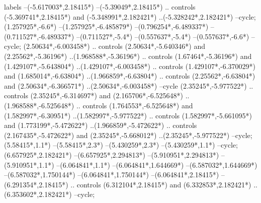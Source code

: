 {\begin{scope}[x=1mm,y=1mm,line width=\SCstroke mm,line cap=round,line join=round]
\begin{SCpart}{labels}
--({-5.617003*\SCF},{2.18415*\SCF})
--({-5.39049*\SCF},{2.18415*\SCF})
.. controls ({-5.369741*\SCF},{2.18415*\SCF}) and ({-5.348991*\SCF},{2.182421*\SCF}) ..({-5.328242*\SCF},{2.182421*\SCF})
--cycle; ({1.257925*\SCF},{-6.6*\SCF})
--({1.257925*\SCF},{-6.485879*\SCF})
--({0.796254*\SCF},{-6.489337*\SCF})
--({0.711527*\SCF},{-6.489337*\SCF})
--({0.711527*\SCF},{-5.4*\SCF})
--({0.557637*\SCF},{-5.4*\SCF})
--({0.557637*\SCF},{-6.6*\SCF})
--cycle;
 ({2.50634*\SCF},{-6.003458*\SCF})
.. controls ({2.50634*\SCF},{-5.640346*\SCF}) and ({2.25562*\SCF},{-5.36196*\SCF}) ..({1.968588*\SCF},{-5.36196*\SCF})
.. controls ({1.67464*\SCF},{-5.36196*\SCF}) and ({1.429107*\SCF},{-5.643804*\SCF}) ..({1.429107*\SCF},{-6.003458*\SCF})
.. controls ({1.429107*\SCF},{-6.370029*\SCF}) and ({1.685014*\SCF},{-6.63804*\SCF}) ..({1.966859*\SCF},{-6.63804*\SCF})
.. controls ({2.25562*\SCF},{-6.63804*\SCF}) and ({2.50634*\SCF},{-6.366571*\SCF}) ..({2.50634*\SCF},{-6.003458*\SCF})
--cycle
({2.35245*\SCF},{-5.977522*\SCF})
.. controls ({2.35245*\SCF},{-6.314697*\SCF}) and ({2.165706*\SCF},{-6.525648*\SCF}) ..({1.968588*\SCF},{-6.525648*\SCF})
.. controls ({1.764553*\SCF},{-6.525648*\SCF}) and ({1.582997*\SCF},{-6.30951*\SCF}) ..({1.582997*\SCF},{-5.977522*\SCF})
.. controls ({1.582997*\SCF},{-5.661095*\SCF}) and ({1.773199*\SCF},{-5.472622*\SCF}) ..({1.966859*\SCF},{-5.472622*\SCF})
.. controls ({2.167435*\SCF},{-5.472622*\SCF}) and ({2.35245*\SCF},{-5.668012*\SCF}) ..({2.35245*\SCF},{-5.977522*\SCF})
--cycle; ({5.58415*\SCF},{1.1*\SCF})
--({5.58415*\SCF},{2.3*\SCF})
--({5.430259*\SCF},{2.3*\SCF})
--({5.430259*\SCF},{1.1*\SCF})
--cycle;
 ({6.657925*\SCF},{2.182421*\SCF})
--({6.657925*\SCF},{2.294813*\SCF})
--({5.910951*\SCF},{2.294813*\SCF})
--({5.910951*\SCF},{1.1*\SCF})
--({6.064841*\SCF},{1.1*\SCF})
--({6.064841*\SCF},{1.644669*\SCF})
--({6.587032*\SCF},{1.644669*\SCF})
--({6.587032*\SCF},{1.750144*\SCF})
--({6.064841*\SCF},{1.750144*\SCF})
--({6.064841*\SCF},{2.18415*\SCF})
--({6.291354*\SCF},{2.18415*\SCF})
.. controls ({6.312104*\SCF},{2.18415*\SCF}) and ({6.332853*\SCF},{2.182421*\SCF}) ..({6.353602*\SCF},{2.182421*\SCF})
--cycle;
\end{SCpart}
\end{scope}
}
